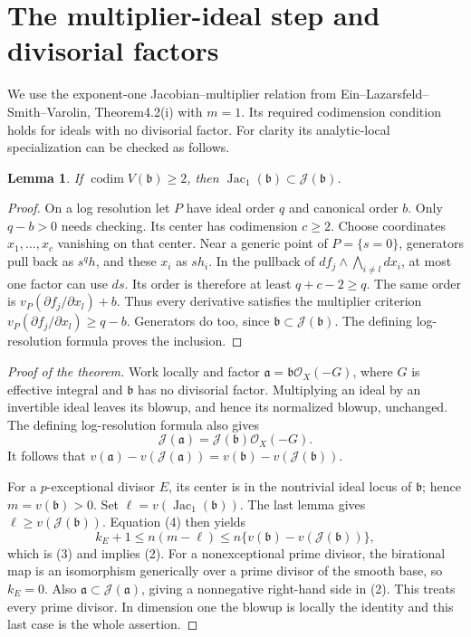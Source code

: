 \documentclass[11pt]{article}
\newcommand{\Jac}{\operatorname{Jac}}
\newcommand{\J}{\mathcal J}
\newtheorem{lemma}{Lemma}
\begin{document}
\section{The multiplier-ideal step and divisorial factors}

We use the exponent-one Jacobian--multiplier relation from
Ein--Lazarsfeld--Smith--Varolin, Theorem4.2(i) with $m=1$.
Its required codimension condition holds for ideals with no
divisorial factor. For clarity its analytic-local specialization
can be checked as follows.

\begin{lemma}
If $\operatorname{codim}V(\mathfrak b)\geq2$, then
$\Jac_1(\mathfrak b)\subset\J(\mathfrak b)$.
\end{lemma}

\begin{proof}
On a log resolution let $P$ have ideal order $q$ and canonical
order $b$. Only $q-b>0$ needs checking. Its center has codimension
$c\geq2$. Choose coordinates $x_1,\ldots,x_c$ vanishing on
that center. Near a generic point of $P=\{s=0\}$, generators
pull back as $s^q h$, and these $x_i$ as $s h_i$.
In the pullback of
$df_j\wedge\bigwedge_{i\ne l}dx_i$, at most one factor can use
$ds$. Its order is therefore at least $q+c-2\geq q$.
The same order is
$v_P(\partial f_j/\partial x_l)+b$. Thus every derivative
satisfies the multiplier criterion
$v_P(\partial f_j/\partial x_l)\geq q-b$.
Generators do too, since $\mathfrak b\subset\J(\mathfrak b)$.
The defining log-resolution formula proves the inclusion.
\end{proof}

\begin{proof}[Proof of the theorem]
Work locally and factor
$\mathfrak a=\mathfrak b\mathcal O_X(-G)$, where $G$ is
effective integral and $\mathfrak b$ has no divisorial factor.
Multiplying an ideal by an invertible ideal leaves its blowup,
and hence its normalized blowup, unchanged. The defining
log-resolution formula also gives
\[
 \J(\mathfrak a)=\J(\mathfrak b)\mathcal O_X(-G).
 \tag{7}
\]
It follows that
$v(\mathfrak a)-v(\J(\mathfrak a))
 =v(\mathfrak b)-v(\J(\mathfrak b))$.

For a $p$-exceptional divisor $E$, its center is in the
nontrivial ideal locus of $\mathfrak b$; hence
$m=v(\mathfrak b)>0$. Set $\ell=v(\Jac_1(\mathfrak b))$.
The last lemma gives $\ell\geq v(\J(\mathfrak b))$.
Equation (4) then yields
\[
 k_E+1\leq n(m-\ell)
 \leq n\{v(\mathfrak b)-v(\J(\mathfrak b))\},
\]
which is (3) and implies (2).
For a nonexceptional prime divisor, the birational map is an
isomorphism generically over a prime divisor of the smooth
base, so $k_E=0$. Also
$\mathfrak a\subset\J(\mathfrak a)$, giving a nonnegative
right-hand side in (2). This treats every prime divisor.
In dimension one the blowup is locally the identity and this
last case is the whole assertion.
\end{proof}
\end{document}
